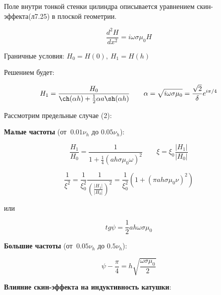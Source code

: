 \documentclass{article}
\begin{document}
Поле внутри тонкой стенки цилиндра описывается уравнением скин-эффекта(л7.25) в плоской геометрии.

\begin{equation}
    \frac{d^2H}{dx^2} = i \omega \sigma \mu_0 H
\end{equation}

Граничные условия: $H_0 = H(0), \ H_1 = H(h)$

Решением будет:


\begin{equation}
    H_1 = \frac{H_0}{\ch(\alpha h) + \frac{1}{2} \alpha a \sh(\alpha h)} \quad \quad 
    \alpha = \sqrt{i\omega \sigma \mu_0} = \frac{\sqrt{2}}{\delta}e^{i\pi/4}
    \label{eq:svyaz_poley}
\end{equation}

\vspace{4cm}
Рассмотрим предельные случае (2):

\textbf{Малые частоты} (от $~ 0.01\nu_h $ до $0.05\nu_h$):

\begin{equation}
    \frac{H_1}{H_0} = \frac{1}{1+\frac{1}{4}(ah\sigma \mu_0 \omega)^2} \quad \quad \xi = \xi_0  \frac{|H_1|}{|H_0|}
\end{equation}

\begin{equation}
    \frac{1}{\xi^2} = \frac{1}{\xi_0^2} \frac{1}{\left ( \frac{|H_1|}{|H_0|} \right )^2 } = \frac{1}{\xi_0^2} \left ( 1 + (\pi ah\sigma \mu_0 \nu)^2\right )
\end{equation}

или

\begin{equation}
    tg\psi = \frac{1}{2}ah\omega \sigma \mu_0
\end{equation}

\textbf{Большие частоты} (от $~ 0.05\nu_h $ до $0.5\nu_h$):

\begin{equation}
    \psi - \frac{\pi}{4} = h\sqrt{\frac{\omega \sigma \mu_0}{2}}
\end{equation}

\textbf{Влияние скин-эффекта на индуктивность катушки}:
\end{document}
